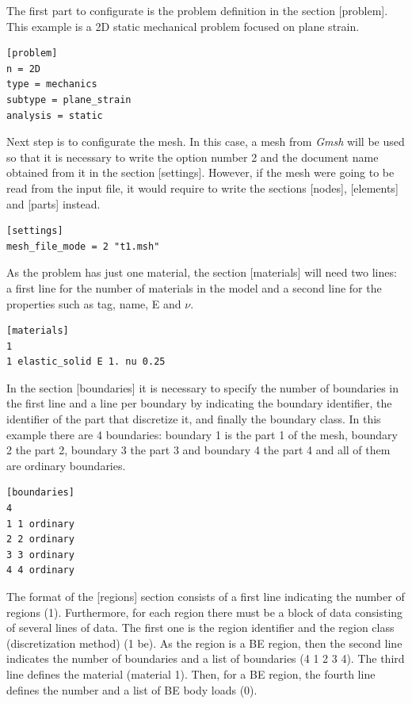 \documentclass[A4]{article}
\begin{document}
The first part to configurate is the problem definition in the section [problem]. This example is a 2D static mechanical problem focused on plane strain.  

\begin{Verbatim}	
[problem]
n = 2D
type = mechanics
subtype = plane_strain
analysis = static
\end{Verbatim}

Next step is to configurate the mesh. In this case, a mesh from \textit{Gmsh} will be used so that it is necessary to write the option number 2 and the document name obtained from it in the section [settings]. However, if the mesh were going to be read from the input file, it would require to write the sections [nodes], [elements] and [parts] instead.

\begin{Verbatim}	
[settings]
mesh_file_mode = 2 "t1.msh"
\end{Verbatim}

As the problem has just one material, the section [materials] will need two lines: a first line for the number of materials in the model and a second line for the properties such as tag, name, E and $\nu$.

\begin{Verbatim}	
[materials]
1
1 elastic_solid E 1. nu 0.25
\end{Verbatim}

In the section [boundaries] it is necessary to specify the number of boundaries in the first line and a line per boundary by indicating the boundary identifier, the identifier of the part that discretize it, and finally the boundary class. In this example there are 4 boundaries: boundary 1 is the part 1 of the mesh, boundary 2 the part 2, boundary 3 the part 3 and boundary 4 the part 4 and all of them are ordinary boundaries.

\begin{Verbatim}	
[boundaries]
4
1 1 ordinary
2 2 ordinary
3 3 ordinary
4 4 ordinary
\end{Verbatim}

The format of the [regions] section consists of a first line indicating the number of regions (1). Furthermore, for each region there must be a block of data consisting of several lines of data. The first one is the region identifier and the region class (discretization method) (1 be). As the region is a BE region, then the second line indicates the number of boundaries and a list of boundaries (4 1 2 3 4). The third line defines the material (material 1). Then, for a BE region, the fourth line defines the number and a list of BE body loads (0).
\end{document}
